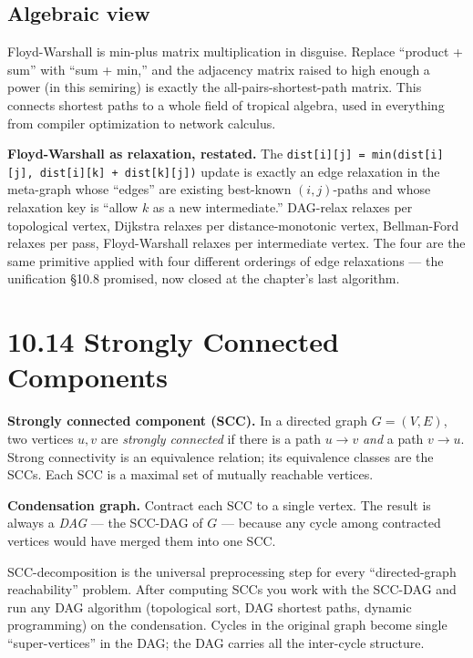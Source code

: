 \documentclass[11pt]{article}
\begin{document}
\subsection*{Algebraic view}

Floyd-Warshall is min-plus matrix multiplication in disguise. Replace ``product + sum'' with ``sum + min,'' and the adjacency matrix raised to high enough a power (in this semiring) is exactly the all-pairs-shortest-path matrix. This connects shortest paths to a whole field of tropical algebra, used in everything from compiler optimization to network calculus.

\begin{notebox}
\textbf{Floyd-Warshall as relaxation, restated.} The
\texttt{dist[i][j] = min(dist[i][j], dist[i][k] + dist[k][j])}
update is exactly an edge relaxation in the meta-graph whose
``edges'' are existing best-known $(i, j)$-paths and whose
relaxation key is ``allow $k$ as a new intermediate.'' DAG-relax
relaxes per topological vertex, Dijkstra relaxes per
distance-monotonic vertex, Bellman-Ford relaxes per pass,
Floyd-Warshall relaxes per intermediate vertex. The four are the
same primitive applied with four different orderings of edge
relaxations --- the unification \S10.8 promised, now closed at the
chapter's last algorithm.
\end{notebox}

\section{10.14 Strongly Connected Components}

\begin{defnbox}
\textbf{Strongly connected component (SCC).} In a directed graph
$G = (V, E)$, two vertices $u, v$ are \emph{strongly connected}
if there is a path $u \to v$ \emph{and} a path $v \to u$. Strong
connectivity is an equivalence relation; its equivalence classes
are the SCCs. Each SCC is a maximal set of mutually reachable
vertices.

\textbf{Condensation graph.} Contract each SCC to a single
vertex. The result is always a \emph{DAG} --- the SCC-DAG of $G$
--- because any cycle among contracted vertices would have merged
them into one SCC.
\end{defnbox}

\begin{ideabox}
SCC-decomposition is the universal preprocessing step for every
``directed-graph reachability'' problem. After computing SCCs you
work with the SCC-DAG and run any DAG algorithm
(topological sort, DAG shortest paths, dynamic programming) on the
condensation. Cycles in the original graph become single
``super-vertices'' in the DAG; the DAG carries all the inter-cycle
structure.
\end{ideabox}
\end{document}
